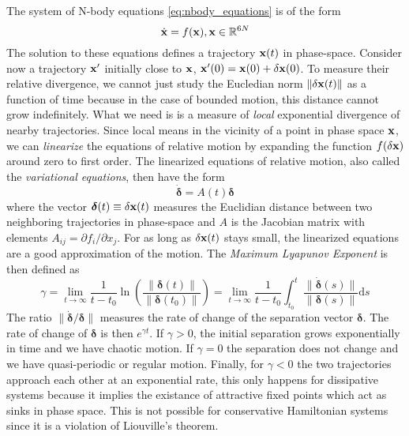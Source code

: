 \documentclass[ twoside,openright,titlepage,numbers=noenddot,headinclude,%
                footinclude=true,cleardoublepage=empty,abstractoff, %
                BCOR=5mm,paper=a4,fontsize=11pt,%
                american,%
                ]{scrreprt}
\begin{document}
The system of N-body equations \cref{eq:nbody_equations} is of the form
\begin{equation}
    \dot{\boldsymbol{\mathbf{x}}}=f(\boldsymbol{\mathbf{x}}),\boldsymbol{\mathbf{x}}\in\mathbb{R}^{6N}
    \label{eq:nbody_eq_general}
\end{equation}
The solution to these equations defines a trajectory $\boldsymbol{\mathbf{x}}(t)$ in phase-space.
Consider now a trajectory $\boldsymbol{\mathbf{x}}'$ initially close to $\boldsymbol{\mathbf{x}}$,
$\boldsymbol{\mathbf{x}}'(0)=\boldsymbol{\mathbf{x}}(0)+\delta\boldsymbol{\mathbf{x}}(0)$. To measure their relative divergence,
we cannot just study the Eucledian norm $\lVert \delta\boldsymbol{\mathbf{x}}(t)\rVert$ as 
a function of time because in the case of bounded motion, this distance cannot
grow indefinitely. What we need is is a measure of \emph{local} exponential
divergence of nearby trajectories. Since local means in the vicinity of a point
in phase space $\boldsymbol{\mathbf{x}}$, we can \emph{linearize} the equations
of relative motion by expanding the function $f(\delta\boldsymbol{\mathbf{x}})$ around
zero to first order. The linearized equations of relative motion, also called
the \emph{variational equations}, then have the form
\begin{equation}
    \dot{\boldsymbol{\delta}}=A(t)\boldsymbol{\delta}
    \label{eq:variational_equations}
\end{equation}
where the vector $\boldsymbol{\delta}(t)\equiv\delta\boldsymbol{\mathbf{x}}(t)$ measures the
Euclidian distance between two neighboring trajectories in phase-space
and $A$ is the Jacobian matrix with elements $A_{ij}=\partial f_i/\partial x_j$.
For as long as $\delta\boldsymbol{\mathbf{x}}(t)$
stays small, the linearized equations are a good approximation of the motion. The
\emph{Maximum Lyapunov Exponent} is then defined as \citep{Hinse2010,morbidelli2002}
\begin{equation}
    \gamma=\lim_{t\rightarrow\infty} \frac{1}{t-t_0} \ln\left( \frac{\lVert 
    \boldsymbol{\delta}(t)\rVert}{\lVert \boldsymbol{\delta}(t_0)\rVert}\right)=
    \lim_{t\rightarrow\infty} \frac{1}{t-t_0}\int^t_{t_0} 
    \frac{\lVert \dot{\boldsymbol{\delta}}(s)\rVert}{\lVert 
    \boldsymbol{\delta}(s)\rVert}\mathrm{d}s
\end{equation}
 The ratio $\lVert\dot{\boldsymbol{\delta}}/ \boldsymbol{\delta}\rVert$ measures the
rate of change of the separation vector $\boldsymbol{\delta}$. The rate of change
of $\boldsymbol{\delta}$ is then $e^{\gamma t}$. If $\gamma >0$, the initial separation
grows exponentially in time and we have chaotic motion. If $\gamma=0$ the separation
does not change and we have quasi-periodic or regular motion. Finally, for $\gamma<0$
the two trajectories approach each other at an exponential rate, this only happens
for dissipative systems because it implies the existance of attractive fixed points which
act as sinks in phase space. This is not possible for conservative Hamiltonian
systems since it is a violation of Liouville's theorem. 
\end{document}
